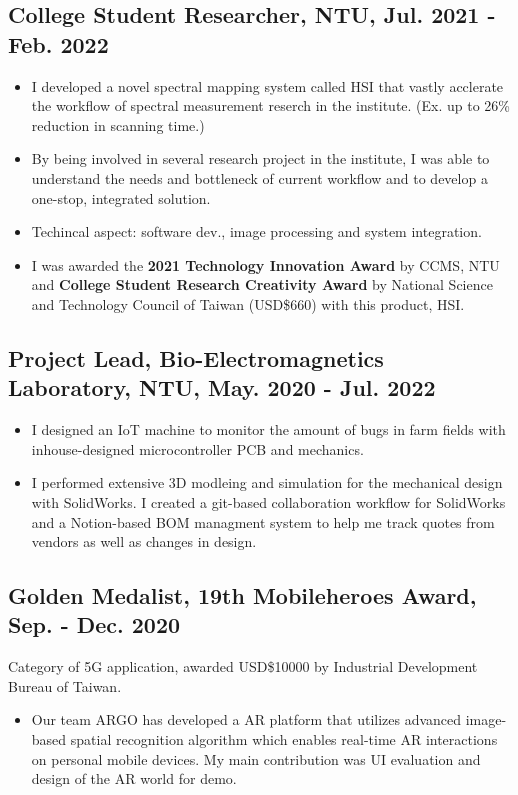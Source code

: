 \documentclass[12pt]{article}
\begin{document}
        \subsection*{College Student Researcher, NTU, Jul. 2021 - Feb. 2022}
        {\sffamily
        \begin{itemize}
            \item I developed a novel spectral mapping system called HSI that vastly acclerate the workflow of spectral measurement reserch in the institute. (Ex. up to 26\% reduction in scanning time.)
            \item By being involved in several research project in the institute, I was able to understand the needs and bottleneck of current workflow and to develop a one-stop, integrated solution. 
            \item Techincal aspect: software dev., image processing and system integration. 
            \item I was awarded the \textbf{2021 Technology Innovation Award} by CCMS, NTU and \textbf{College Student Research Creativity Award} by National Science and Technology Council of Taiwan (USD\$660) with this product, HSI.
        \end{itemize}}
        \subsection*{Project Lead, Bio-Electromagnetics Laboratory, NTU, May. 2020 - Jul. 2022}
        {\sffamily
        \begin{itemize}
            \item I designed an IoT machine to monitor the amount of bugs in farm fields with inhouse-designed microcontroller PCB and mechanics.
            \item I performed extensive 3D modleing and simulation for the mechanical design with SolidWorks. I created a git-based collaboration workflow for SolidWorks and a Notion-based BOM managment system to help me track quotes from vendors as well as changes in design.
        \end{itemize}
        }
        \subsection*{Golden Medalist, 19th Mobileheroes Award, Sep. - Dec. 2020}
        {\sffamily
        {\footnotesize Category of 5G application, awarded USD\$10000 by Industrial Development Bureau of Taiwan.}
        \begin{itemize}
            \item Our team ARGO has developed a AR platform that utilizes advanced image-based spatial recognition algorithm which enables real-time AR interactions on personal mobile devices. My main contribution was UI evaluation and design of the AR world for demo.   
        \end{itemize}
        }
        
\end{document}
